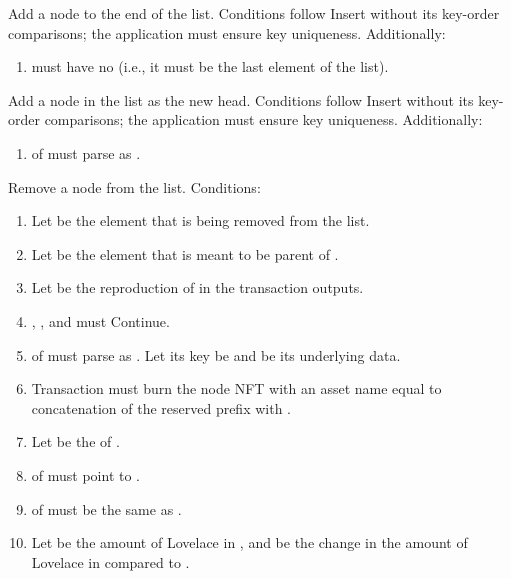 \documentclass[../midgard.tex]{subfiles}
\begin{document}
\begin{description}
\begin{enumerate}
      \end{enumerate}
    \item[Append unordered.] Add a node to the end of the list.
      Conditions follow Insert without its key-order comparisons; the application must ensure key uniqueness. Additionally:
      \begin{enumerate}
        \item {} must have no  (i.e., it must be the last element of the list).
      \end{enumerate}
    \item[Prepend unordered.] Add a node in the list as the new head.
      Conditions follow Insert without its key-order comparisons; the application must ensure key uniqueness. Additionally:
      \begin{enumerate}
        \item {} of  must parse as .
      \end{enumerate}
    \item[Remove.] Remove a node from the list.
      Conditions:
      \begin{enumerate}
        \item Let  be the element that is being removed from the list.
        \item Let  be the element that is meant to be parent of .
        \item Let  be the reproduction of  in the transaction outputs.
        \item {}, , and  must Continue.
        \item {} of  must parse as .
          Let its key be  and  be its underlying data.
        \item Transaction must burn the node NFT with an asset name equal to concatenation of the reserved prefix with .
        \item Let  be the  of .
        \item {} of  must point to .
        \item {} of  must be the same as .
        \item Let  be the amount of Lovelace in , and  be the change in the amount of Lovelace in  compared to .

\end{enumerate}
\end{description}
\end{document}
